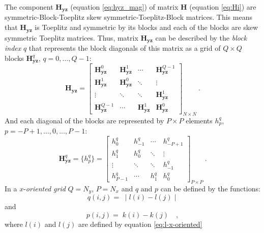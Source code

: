 The component $\mathbf{H_{yz}}$ (equation \ref{eq:hyz_mag}) of matrix $\mathbf{H}$ (equation \ref{eq:Hi}) are symmetric-Block-Toeplitz skew symmetric-Toeplitz-Block matrices. This means that $\mathbf{H_{yz}}$ is Toeplitz and symmetric by its blocks and each of the blocks are skew symmetric Toeplitz matrices.
Thus, matrix $\mathbf{H_{yz}}$ can be described by the \textit{block index} $q$ that represents the block diagonals of this matrix as a grid of $Q \times Q$ blocks $\mathbf{H}^{q}_\mathbf{yz}$, $q = 0, \dots, Q - 1$:
\begin{equation}
\mathbf{H_{yz}} = \begin{bmatrix}
\mathbf{H}^{0}_\mathbf{yz}  & \mathbf{H}^{1}_\mathbf{yz} & \cdots         & \mathbf{H}^{Q-1}_\mathbf{yz} \\
\mathbf{H}^{1}_\mathbf{yz}  & \mathbf{H}^{0}_\mathbf{yz} & \ddots         & \vdots           \\ 
\vdots           & \ddots         & \ddots         & \mathbf{H}^{1}_\mathbf{yz}   \\
\mathbf{H}^{Q-1}_\mathbf{yz} & \cdots         & \mathbf{H}^{1}_\mathbf{yz} & \mathbf{H}^{0}_\mathbf{yz}                
\end{bmatrix}_{N \times N} \: .
\label{eq:BTTB_Hyz}
\end{equation}
And each diagonal of the blocks are represented by $P \times P$ elements $h^{q}_{p}$, $p = -P + 1, \dots, 0, \dots, P - 1$:
\begin{equation}
\mathbf{H}^{q}_\mathbf{yz} =  \{h^{q}_p\} = \begin{bmatrix}
h^{q}_{0}   & h^{q}_{-1} & \cdots    & h^{q}_{-P+1} \\
h^{q}_{1}   & h^{q}_{0} & \ddots    & \vdots           \\ 
\vdots      & \ddots    & \ddots    & h^{q}_{-1}   \\
h^{q}_{P-1} & \cdots    & h^{q}_{1} & h^{q}_{0}                 
\end{bmatrix}_{P \times P} \: .
\label{eq:Hyz_block}
\end{equation}
In a $x$-\textit{oriented grid} $Q = N_{y}$, $P = N_{x}$ and $q$ and $p$ can be defined by the functions:
\begin{equation}
q(i, j) = \; \mid l(i) - l(j) \mid
\label{eq:Hyz-q-x-oriented}
\end{equation}
and
\begin{equation}
p(i, j) = \; k(i) - k(j) \quad ,
\label{eq:Hyz-p-x-oriented}
\end{equation}
where $l(i)$ and $l(j)$ are defined by equation \ref{eq:l-x-oriented} 
